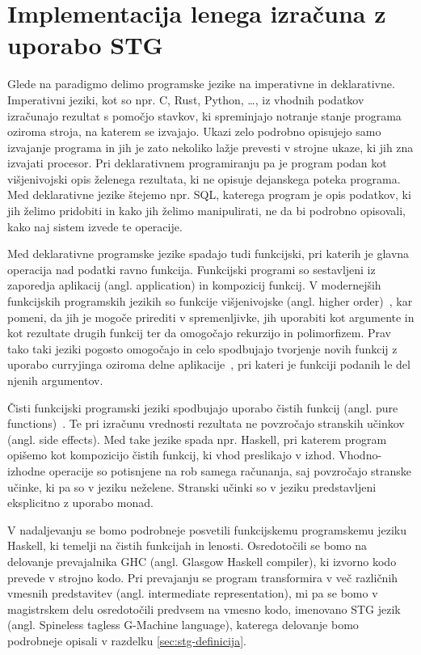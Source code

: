 \chapter{Implementacija lenega izračuna z uporabo STG}
\label{ch:stg}

Glede na paradigmo delimo programske jezike na imperativne in deklarativne. Imperativni jeziki, kot so npr. C, Rust, Python, \dots, iz vhodnih podatkov izračunajo rezultat s pomočjo stavkov, ki spreminjajo notranje stanje programa oziroma stroja, na katerem se izvajajo. Ukazi zelo podrobno opisujejo samo izvajanje programa in jih je zato nekoliko lažje prevesti v strojne ukaze, ki jih zna izvajati procesor. Pri deklarativnem programiranju pa je program podan kot višjenivojski opis želenega rezultata, ki ne opisuje dejanskega poteka programa. Med deklarativne jezike štejemo npr. SQL, katerega program je opis podatkov, ki jih želimo pridobiti in kako jih želimo manipulirati, ne da bi podrobno opisovali, kako naj sistem izvede te operacije.

Med deklarativne programske jezike spadajo tudi funkcijski, pri katerih je glavna operacija nad podatki ravno funkcija. Funkcijski programi so sestavljeni iz zaporedja aplikacij (angl. application) in kompozicij funkcij. V modernejših funkcijskih programskih jezikih so funkcije višjenivojske (angl. higher order)~\cite{hudak1989conception}, kar pomeni, da jih je mogoče prirediti v spremenljivke, jih uporabiti kot argumente in kot rezultate drugih funkcij ter da omogočajo rekurzijo in polimorfizem. Prav tako taki jeziki pogosto omogočajo in celo spodbujajo tvorjenje novih funkcij z uporabo curryjinga oziroma delne aplikacije~\cite{hudak1989conception}, pri kateri je funkciji podanih le del njenih argumentov.

Čisti funkcijski programski jeziki spodbujajo uporabo čistih funkcij (angl. pure functions)~\cite{hudak1989conception}. Te pri izračunu vrednosti rezultata ne povzročajo stranskih učinkov (angl. side effects). Med take jezike spada npr. Haskell, pri katerem program opišemo kot kompozicijo čistih funkcij, ki vhod preslikajo v izhod. Vhodno-izhodne operacije so potisnjene na rob samega računanja, saj povzročajo stranske učinke, ki pa so v jeziku neželene. Stranski učinki so v jeziku predstavljeni eksplicitno z uporabo monad. 

V nadaljevanju se bomo podrobneje posvetili funkcijskemu programskemu jeziku Haskell, ki temelji na čistih funkcijah in lenosti. Osredotočili se bomo na delovanje prevajalnika GHC (angl. Glasgow Haskell compiler), ki izvorno kodo prevede v strojno kodo. Pri prevajanju se program transformira v več različnih vmesnih predstavitev (angl. intermediate representation), mi pa se bomo v magistrskem delu osredotočili predvsem na vmesno kodo, imenovano STG jezik (angl. Spineless tagless G-Machine language), katerega delovanje bomo podrobneje opisali v razdelku \ref{sec:stg-definicija}.

